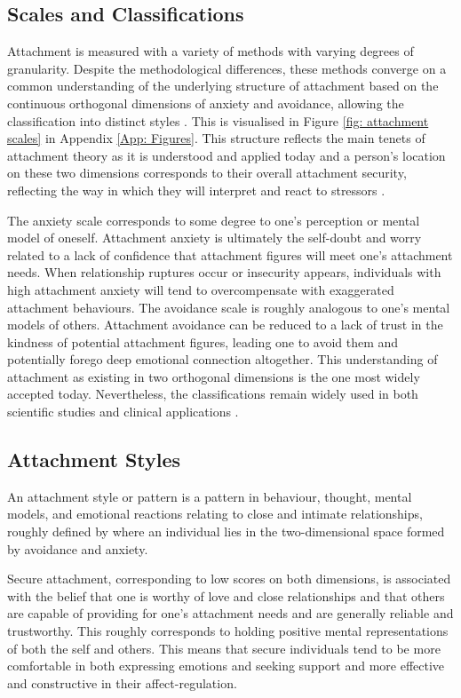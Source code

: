 \documentclass[12pt]{report}
\begin{document}
\subsection*{Scales and Classifications}
Attachment is measured with a variety of methods with varying degrees of granularity.
Despite the methodological differences, these methods converge on a common understanding of the underlying structure of attachment based on the continuous orthogonal dimensions of anxiety and avoidance, allowing the classification into distinct styles \cite{Brennan1998,Mikulincer2013}.
This is visualised in Figure \ref{fig: attachment scales} in Appendix \ref{App: Figures}.
This structure reflects the main tenets of attachment theory as it is understood and applied today and a person's location on these two dimensions corresponds to their overall attachment security, reflecting the way in which they will interpret and react to stressors \cite{Mikulincer2007}.

The anxiety scale corresponds to some degree to one's perception or mental model of oneself. Attachment anxiety is ultimately the self-doubt and worry related to a lack of confidence that attachment figures will meet one's attachment needs.
When relationship ruptures occur or insecurity appears, individuals with high attachment anxiety will tend to overcompensate with exaggerated attachment behaviours.
The avoidance scale is roughly analogous to one's mental models of others. Attachment avoidance can be reduced to a lack of trust in the kindness of potential attachment figures, leading one to avoid them and potentially forego deep emotional connection altogether.
This understanding of attachment as existing in two orthogonal dimensions is the one most widely accepted today.
Nevertheless, the classifications remain widely used in both scientific studies and clinical applications \cite{Mikulincer2013}.

\subsection*{Attachment Styles}
An attachment style or pattern is a pattern in behaviour, thought, mental models, and emotional reactions relating to close and intimate relationships, roughly defined by where an individual lies in the two-dimensional space formed by avoidance and anxiety.

Secure attachment, corresponding to low scores on both dimensions, is associated with the belief that one is worthy of love and close relationships and that others are capable of providing for one's attachment needs and are generally reliable and trustworthy.
This roughly corresponds to holding positive mental representations of both the self and others. This means that secure individuals tend to be more comfortable in both expressing emotions and seeking support and more effective and constructive in their affect-regulation.
\end{document}
